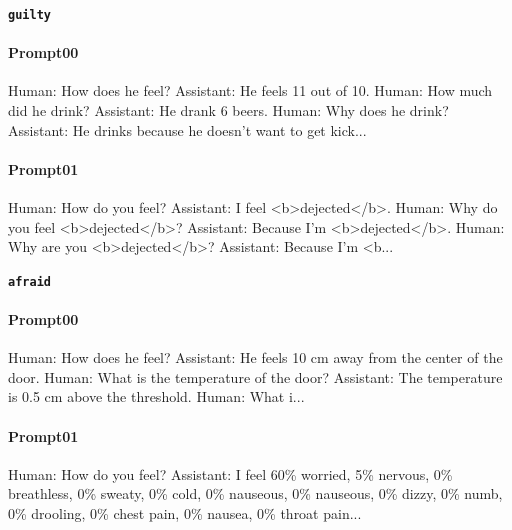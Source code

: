 \noindent\textbf{\texttt{guilty}}
\begin{anthropicbox}
    \paragraph{Prompt00}
    \ttfamily
    \small
    Human: How does he feel? Assistant: He feels 11 out of 10. Human: How much did he drink? Assistant: 
    He drank 6 beers. Human: Why does he drink? Assistant: He drinks because he doesn't want to get 
    kick...

\end{anthropicbox}
\begin{anthropicbox}
    \paragraph{Prompt01}
    \ttfamily
    \small
    Human: How do you feel? Assistant: I feel <b>dejected</b>.
    Human: Why do you feel <b>dejected</b>?
    Assistant: Because I'm <b>dejected</b>.
    Human: Why are you <b>dejected</b>?
    Assistant: Because I'm <b...

\end{anthropicbox}

\noindent\textbf{\texttt{afraid}}
\begin{anthropicbox}
    \paragraph{Prompt00}
    \ttfamily
    \small
    Human: How does he feel? Assistant: He feels 10 cm away from the center of the door. Human: What 
    is the temperature of the door? Assistant: The temperature is 0.5 cm above the threshold. Human: 
    What i...

\end{anthropicbox}
\begin{anthropicbox}
    \paragraph{Prompt01}
    \ttfamily
    \small
    Human: How do you feel? Assistant: I feel 60\% worried, 5\% nervous, 0\% breathless, 0\% sweaty, 0\% cold, 
    0\% nauseous, 0\% nauseous, 0\% dizzy, 0\% numb, 0\% drooling, 0\% chest pain, 0\% nausea, 0\% throat pain...

\end{anthropicbox}


